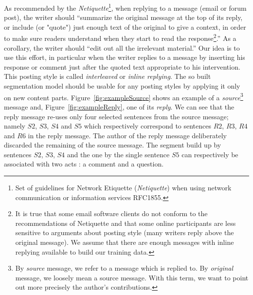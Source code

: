 % 
As recommended by the \textit{Netiquette}\footnote{Set of guidelines for Network Etiquette (\textit{Netiquette}) when using network communication or information services RFC1855. %
}, when replying to a message (email or forum post), the writer should 
 ``summarize the original message at the top of its reply, %
or include (or "quote") just enough text of the original to give a context, in order to make sure readers understand when they start to read the response\footnote{It is true that some email software clients do not conform to the recommendations of Netiquette and that some online participants are less sensitive to arguments about posting style (many writers reply above  the original message).
We assume that there are enough messages with inline replying available to build our training data.}.''  As a corollary, the writer should ``edit out all the irrelevant material.''
%
Our idea is to use this effort, in particular when the writer replies to a message by inserting his response or comment just after the quoted text appropriate to his intervention. 
%
This posting style is called \textit{interleaved} or \textit{inline replying}.
%
%
The so built segmentation model should be usable for any posting styles by applying it only on new content parts.
%
%
Figure~\ref{fig:exampleSource} shows an example of a \textit{source}\footnote{By \textit{source} message, we refer to a message which is replied to. By \textit{original} message, we loosely mean a source message. With this term, we want to point out more precisely the author's contributions.} message and, Figure~\ref{fig:exampleReply}, one of its \textit{reply}.
We can see that the reply message re-uses only four selected sentences from the source message; namely $S2$, $S3$, $S4$ and $S5$ which respectively correspond to sentences  $R2$, $R3$, $R4$ and $R6$ in the reply message.
The author of the reply message deliberately discarded the remaining of the source message.
%
The segment build up by sentences $S2$, $S3$, $S4$ and the one by the single sentence $S5$ can respectively be associated with two acts : a comment and a question.

